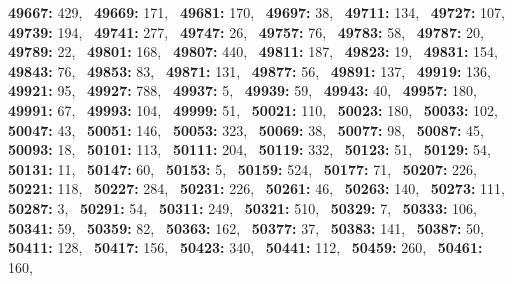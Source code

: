 \textbf{49667:} 429,\allowbreak~ 
\textbf{49669:} 171,\allowbreak~ 
\textbf{49681:} 170,\allowbreak~ 
\textbf{49697:} 38,\allowbreak~ 
\textbf{49711:} 134,\allowbreak~ 
\textbf{49727:} 107,\allowbreak~ 
\textbf{49739:} 194,\allowbreak~ 
\textbf{49741:} 277,\allowbreak~ 
\textbf{49747:} 26,\allowbreak~ 
\textbf{49757:} 76,\allowbreak~ 
\textbf{49783:} 58,\allowbreak~ 
\textbf{49787:} 20,\allowbreak~ 
\textbf{49789:} 22,\allowbreak~ 
\textbf{49801:} 168,\allowbreak~ 
\textbf{49807:} 440,\allowbreak~ 
\textbf{49811:} 187,\allowbreak~ 
\textbf{49823:} 19,\allowbreak~ 
\textbf{49831:} 154,\allowbreak~ 
\textbf{49843:} 76,\allowbreak~ 
\textbf{49853:} 83,\allowbreak~ 
\textbf{49871:} 131,\allowbreak~ 
\textbf{49877:} 56,\allowbreak~ 
\textbf{49891:} 137,\allowbreak~ 
\textbf{49919:} 136,\allowbreak~ 
\textbf{49921:} 95,\allowbreak~ 
\textbf{49927:} 788,\allowbreak~ 
\textbf{49937:} 5,\allowbreak~ 
\textbf{49939:} 59,\allowbreak~ 
\textbf{49943:} 40,\allowbreak~ 
\textbf{49957:} 180,\allowbreak~ 
\textbf{49991:} 67,\allowbreak~ 
\textbf{49993:} 104,\allowbreak~ 
\textbf{49999:} 51,\allowbreak~ 
\textbf{50021:} 110,\allowbreak~ 
\textbf{50023:} 180,\allowbreak~ 
\textbf{50033:} 102,\allowbreak~ 
\textbf{50047:} 43,\allowbreak~ 
\textbf{50051:} 146,\allowbreak~ 
\textbf{50053:} 323,\allowbreak~ 
\textbf{50069:} 38,\allowbreak~ 
\textbf{50077:} 98,\allowbreak~ 
\textbf{50087:} 45,\allowbreak~ 
\textbf{50093:} 18,\allowbreak~ 
\textbf{50101:} 113,\allowbreak~ 
\textbf{50111:} 204,\allowbreak~ 
\textbf{50119:} 332,\allowbreak~ 
\textbf{50123:} 51,\allowbreak~ 
\textbf{50129:} 54,\allowbreak~ 
\textbf{50131:} 11,\allowbreak~ 
\textbf{50147:} 60,\allowbreak~ 
\textbf{50153:} 5,\allowbreak~ 
\textbf{50159:} 524,\allowbreak~ 
\textbf{50177:} 71,\allowbreak~ 
\textbf{50207:} 226,\allowbreak~ 
\textbf{50221:} 118,\allowbreak~ 
\textbf{50227:} 284,\allowbreak~ 
\textbf{50231:} 226,\allowbreak~ 
\textbf{50261:} 46,\allowbreak~ 
\textbf{50263:} 140,\allowbreak~ 
\textbf{50273:} 111,\allowbreak~ 
\textbf{50287:} 3,\allowbreak~ 
\textbf{50291:} 54,\allowbreak~ 
\textbf{50311:} 249,\allowbreak~ 
\textbf{50321:} 510,\allowbreak~ 
\textbf{50329:} 7,\allowbreak~ 
\textbf{50333:} 106,\allowbreak~ 
\textbf{50341:} 59,\allowbreak~ 
\textbf{50359:} 82,\allowbreak~ 
\textbf{50363:} 162,\allowbreak~ 
\textbf{50377:} 37,\allowbreak~ 
\textbf{50383:} 141,\allowbreak~ 
\textbf{50387:} 50,\allowbreak~ 
\textbf{50411:} 128,\allowbreak~ 
\textbf{50417:} 156,\allowbreak~ 
\textbf{50423:} 340,\allowbreak~ 
\textbf{50441:} 112,\allowbreak~ 
\textbf{50459:} 260,\allowbreak~ 
\textbf{50461:} 160,\allowbreak~ 
